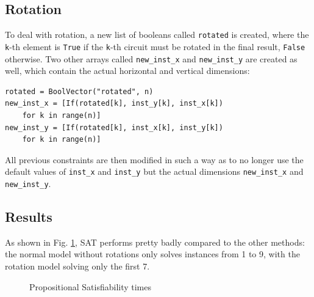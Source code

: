 \documentclass[a4paper, 12pt]{article}
\begin{document}
\subsection{Rotation}
To deal with rotation, a new list of booleans called \verb|rotated| is created, where the \verb|k|-th element is \verb|True| if the \verb|k|-th circuit must be rotated in the final result, \verb|False| otherwise. Two other arrays called \verb|new_inst_x| and \verb|new_inst_y| are created as well, which contain the actual horizontal and vertical dimensions:
\begin{verbatim}
rotated = BoolVector("rotated", n)
new_inst_x = [If(rotated[k], inst_y[k], inst_x[k])
    for k in range(n)]
new_inst_y = [If(rotated[k], inst_x[k], inst_y[k])
    for k in range(n)]
 \end{verbatim}
 
All previous constraints are then modified in such a way as to no longer use the default values of \verb|inst_x| and \verb|inst_y| but the actual dimensions \verb|new_inst_x| and \verb|new_inst_y|.

\subsection{Results}
As shown in Fig. \ref{fig:sat}, SAT performs pretty badly compared to the other methods: the normal model without rotations only solves instances from 1 to 9, with the rotation model solving only the first 7.

\begin{figure}
    \centering
        \caption{Propositional Satisfiability times}
    \label{fig:sat}  
\end{figure}
\end{document}
